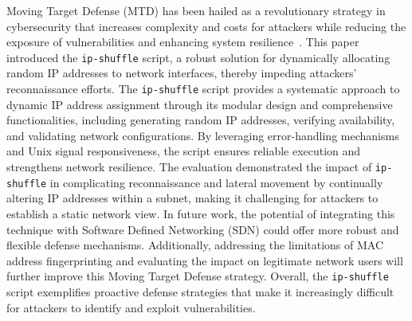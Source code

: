 Moving Target Defense (MTD) has been hailed as a revolutionary strategy in cybersecurity that increases complexity and costs for attackers while reducing the exposure of vulnerabilities and enhancing system resilience~\cite{cai2016introduction}. This paper introduced the \texttt{ip-shuffle} script, a robust solution for dynamically allocating random IP addresses to network interfaces, thereby impeding attackers' reconnaissance efforts.
The \texttt{ip-shuffle} script provides a systematic approach to dynamic IP address assignment through its modular design and comprehensive functionalities, including generating random IP addresses, verifying availability, and validating network configurations. By leveraging error-handling mechanisms and Unix signal responsiveness, the script ensures reliable execution and strengthens network resilience. The evaluation demonstrated the impact of \texttt{ip-shuffle} in complicating reconnaissance and lateral movement by continually altering IP addresses within a subnet, making it challenging for attackers to establish a static network view.
In future work, the potential of integrating this technique with Software Defined Networking (SDN) could offer more robust and flexible defense mechanisms. Additionally, addressing the limitations of MAC address fingerprinting and evaluating the impact on legitimate network users will further improve this Moving Target Defense strategy. Overall, the \texttt{ip-shuffle} script exemplifies proactive defense strategies that make it increasingly difficult for attackers to identify and exploit vulnerabilities.
